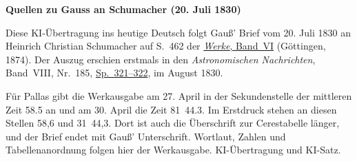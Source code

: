 \clearpage\thispagestyle{empty}
\begin{center}\textbf{Quellen zu Gauss an Schumacher (20. Juli 1830)}\end{center}
\noindent Diese KI-Übertragung ins heutige Deutsch folgt Gauß’ Brief vom 20. Juli 1830 an Heinrich Christian Schumacher auf S.~462 der \href{https://gdz.sub.uni-goettingen.de/id/PPN236007467}{\textit{Werke}, Band~VI} (Göttingen, 1874). Der Auszug erschien erstmals in den \textit{Astronomischen Nachrichten}, Band~VIII, Nr.~185, \href{https://api.digitale-sammlungen.de/iiif/image/v2/bsb10049433_00169/full/1800,/0/default.jpg}{Sp.~321--322}, im August 1830.
\par\smallskip\noindent Für Pallas gibt die Werkausgabe am 27. April in der Sekundenstelle der mittleren Zeit 58.5 an und am 30. April die Zeit 81~44.3. Im Erstdruck stehen an diesen Stellen 58,6 und 31~44,3. Dort ist auch die Überschrift zur Cerestabelle länger, und der Brief endet mit Gauß’ Unterschrift. Wortlaut, Zahlen und Tabellenanordnung folgen hier der Werkausgabe. KI-Übertragung und KI-Satz.
\clearpage
